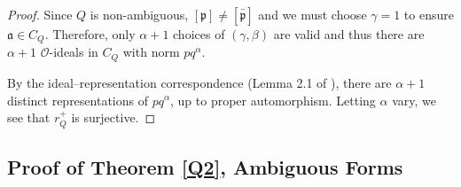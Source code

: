 \documentclass[11pt]{amsart}
\theoremstyle{definition}
\begin{document}
\begin{proof}
Since $Q$ is non-ambiguous, $[\mathfrak{p}]\neq [\mathfrak{\bar{p}}]$ and we must choose $\gamma=1$ to ensure $\mathfrak{a}\in C_Q$. Therefore, only $\alpha+1$ choices of $(\gamma,\beta)$ are valid and thus there are $\alpha+1$ $\mathcal{O}$-ideals in $C_Q$ with norm $pq^\alpha$.

By the ideal--representation correspondence (Lemma 2.1 of \cite{BG06}), there are $\alpha+1$ distinct representations of $pq^{\alpha}$, up to proper automorphism. Letting $\alpha$ vary, we see that $r_Q^+$ is surjective.
\end{proof}

\subsection{Proof of Theorem \ref{Q2}, Ambiguous Forms}\label{Q_Ambiguous}
\end{document}
